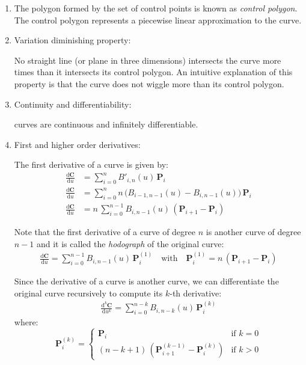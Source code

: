 \begin{enumerate}
    
    \item The polygon formed by the set of control points is known as \textit{control polygon}. The control polygon represents a piecewise linear approximation to the \Bezier curve.

    \item Variation diminishing property:
    
    No straight line (or plane in three dimensions) intersects the \Bezier curve more times than it intersects its control polygon. An intuitive explanation of this property is that the \Bezier curve does not wiggle more than its control polygon.
    
    \item Continuity and differentiability:
    
    \Bezier curves are continuous and infinitely differentiable.
    
    \item First and higher order derivatives:
    
    The first derivative of a \Bezier curve is given by:
    \begin{align*}
        \frac{\mathrm{d}\mathbf{C}}{\mathrm{d}u} &= \sum_{i=0}^{n}B'_{i,n}(u)\, \mathbf{P}_{i} \\
        \frac{\mathrm{d}\mathbf{C}}{\mathrm{d}u} &= \sum_{i=0}^{n} n\, \big( B_{i-1,n-1}(u) - B_{i,n-1}(u)\big) \, \mathbf{P}_{i} \\
        \frac{\mathrm{d}\mathbf{C}}{\mathrm{d}u} &= n \, \sum_{i=0}^{n-1}B_{i,n-1}(u)\, (\mathbf{P}_{i+1} - \mathbf{P}_{i})
    \end{align*}
    
    Note that the first derivative of a \Bezier curve of degree $n$ is another \Bezier curve of degree $n-1$ and it is called the \textit{hodograph} of the original \Bezier curve:
    \begin{align*}
        \frac{\mathrm{d}\mathbf{C}}{\mathrm{d}u} = \sum_{i=0}^{n-1} B_{i,n-1}(u)\, \mathbf{P}^{(1)}_{i} \quad \text{with} \quad \mathbf{P}^{(1)}_{i} = n\, (\mathbf{P}_{i+1} - \mathbf{P}_{i})
    \end{align*}
    
    Since the derivative of a \Bezier curve is another \Bezier curve, we can differentiate the original curve recursively to compute its $k$-th derivative:
    \begin{align*}
        \frac{\mathrm{d}^k\mathbf{C}}{\mathrm{d}u^k} = \sum_{i=0}^{n-k} B_{i,n-k}(u) \, \mathbf{P}_{i}^{(k)}
    \end{align*}
    where:
    \begin{equation*}
        \mathbf{P}_{i}^{(k)} =  \begin{cases}
            \mathbf{P}_{i} & \text{if $k=0$}\\
            (n-k+1) \, (\mathbf{P}_{i+1}^{(k-1)} - \mathbf{P}_{i}^{(k)}) &\text{if $k>0$}
            \end{cases}
    \end{equation*}



\end{enumerate}
